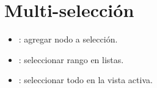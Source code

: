 \section{Multi-selección}

\begin{itemize}
    \item {}: agregar nodo a selección.
    \item {}: seleccionar rango en listas.
    \item {}: seleccionar todo en la vista activa.
\end{itemize}
